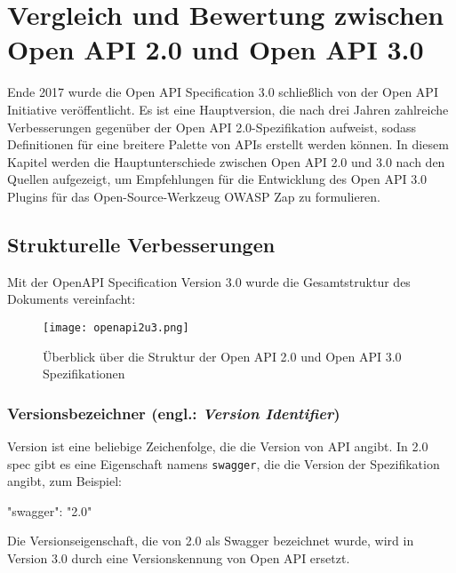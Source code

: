 \chapter{Vergleich und Bewertung zwischen Open API 2.0 und Open API 3.0}
\label{cha:k6}

Ende 2017 wurde die Open API Specification 3.0 schließlich von der Open API Initiative veröffentlicht. Es ist eine Hauptversion, die nach drei Jahren zahlreiche Verbesserungen gegenüber der Open API 2.0-Spezifikation aufweist, sodass Definitionen für eine breitere Palette von APIs erstellt werden können. In diesem Kapitel werden die Hauptunterschiede zwischen Open API 2.0 und 3.0 nach den Quellen\cite{swagger20Github, openapi20Github} aufgezeigt, um Empfehlungen für die Entwicklung des Open API 3.0 Plugins für das Open-Source-Werkzeug OWASP Zap zu formulieren.

\section{Strukturelle Verbesserungen}

Mit der OpenAPI Specification Version 3.0 wurde die Gesamtstruktur des Dokuments vereinfacht:

\newpage

\begin{figure}[h]
	\centering
	\texttt{[image: openapi2u3.png]}
	\caption{Überblick über die Struktur der Open API 2.0 und Open API 3.0 Spezifikationen\cite{openapi2u317}}
	\label{openapi2u317-1}
\end{figure}

\subsection{Versionsbezeichner (engl.: \textit{Version Identifier})}

Version ist eine beliebige Zeichenfolge, die die Version von API angibt\cite{openapiversion17}. In 2.0 spec gibt es eine Eigenschaft namens \texttt{swagger}, die die Version der Spezifikation angibt, zum Beispiel:\\

\begin{LaTeXCode}[caption={Version von Swagger},captionpos=b, label=LaTeXCode:swagger2.0-1][numbers=none]
"swagger": "2.0"\\
\end{LaTeXCode}

Die Versionseigenschaft, die von 2.0 als Swagger bezeichnet wurde, wird in Version 3.0 durch eine Versionskennung von Open API ersetzt\cite{swagger20Github, openapi20Github}.\\

